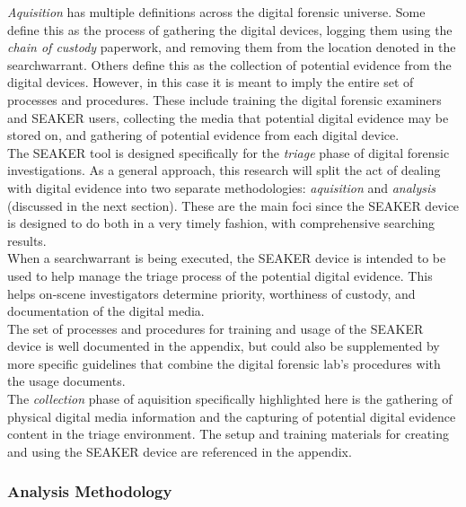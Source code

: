 \documentclass[12pt]{article}
\begin{document}
{\em Aquisition} has multiple definitions across the digital forensic universe.
Some define this as the process of gathering the digital devices, logging them using the 
{\em chain of custody} paperwork, and removing them from the location denoted in the
\gls{searchwarrant}.  Others define this as the collection of potential evidence from the digital
devices.  However, in this case it is meant to imply the entire set of processes and
procedures.  These include training the digital forensic examiners and SEAKER users, 
collecting the media that potential digital evidence may be stored on, and
gathering of potential evidence from each digital device.\\

The SEAKER tool is designed specifically for the {\em triage} phase of digital forensic
investigations.  As a general approach, this research will split the act of dealing with digital evidence into two
separate methodologies: {\em aquisition} and {\em analysis} (discussed in the next section).
These are the main foci since the SEAKER
device is designed to do both in a very timely fashion, with comprehensive searching results.\\

When a \gls{searchwarrant} is being executed, the SEAKER device is intended to be used to help
manage the triage process of the potential digital evidence.  This helps on-scene investigators
determine priority, worthiness of custody, and documentation of the digital media\cite{hitchcock2016tiered}.\\ 

The set of processes and procedures for training and usage of the SEAKER device is well
documented in the appendix, but could also be supplemented by more specific guidelines that
combine the digital forensic lab's procedures with the usage documents.\\

The {\em collection} phase of aquisition specifically highlighted here is the gathering
of physical digital media information and the capturing of potential digital evidence content
in the triage environment.  The setup and training materials for creating and using the
SEAKER device are referenced in the appendix.\\

\subsubsection{Analysis Methodology}
\end{document}
